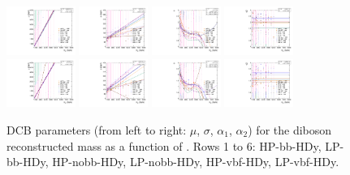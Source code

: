 \begin{figure}[htbp]
  \includegraphics[width=0.2\textwidth]{fig/2Dfit/paramSignalShape_allSig_MVV_HP_vbf_HDy_MEAN.pdf}
  \includegraphics[width=0.2\textwidth]{fig/2Dfit/paramSignalShape_allSig_MVV_HP_vbf_HDy_SIGMA.pdf}
  \includegraphics[width=0.2\textwidth]{fig/2Dfit/paramSignalShape_allSig_MVV_HP_vbf_HDy_ALPHA1.pdf}
  \includegraphics[width=0.2\textwidth]{fig/2Dfit/paramSignalShape_allSig_MVV_HP_vbf_HDy_ALPHA2.pdf}\\
  \includegraphics[width=0.2\textwidth]{fig/2Dfit/paramSignalShape_allSig_MVV_LP_vbf_HDy_MEAN.pdf}
  \includegraphics[width=0.2\textwidth]{fig/2Dfit/paramSignalShape_allSig_MVV_LP_vbf_HDy_SIGMA.pdf}
  \includegraphics[width=0.2\textwidth]{fig/2Dfit/paramSignalShape_allSig_MVV_LP_vbf_HDy_ALPHA1.pdf}
  \includegraphics[width=0.2\textwidth]{fig/2Dfit/paramSignalShape_allSig_MVV_LP_vbf_HDy_ALPHA2.pdf}\\
  \caption{
    DCB parameters (from left to right: $\mu$, $\sigma$, $\alpha_1$, $\alpha_2$) for the diboson reconstructed mass \MVV as a function of \MX.
    Rows 1 to 6: HP-bb-HDy, LP-bb-HDy, HP-nobb-HDy, LP-nobb-HDy, HP-vbf-HDy, LP-vbf-HDy.
  }
  \label{fig:MVVShapeParam_HDy_Run2}
\end{figure}

